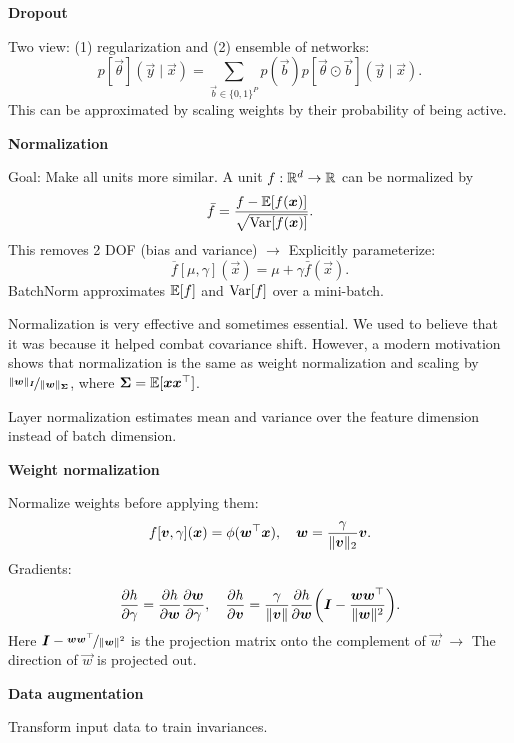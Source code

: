 \documentclass[10pt]{article}
\newenvironment{topic}[1]
{\textbf{\sffamily \colorbox{black}{\rlap{\textbf{\textcolor{white}{#1}}}\hspace{\linewidth}\hspace{-2\fboxsep}}}}
{}
\newenvironment{subtopic}[1]
{\begin{center}\textbf{\sffamily #1}\end{center}}
{}
\begin{document}
\begin{multicols*}{3}
\begin{topic}{Tricks of the trade}
\begin{subtopic}{Dropout}
            Two view: (1) regularization and (2) ensemble of networks: \[
                p[\vec{\theta}](\vec{y} \mid \vec{x}) = \sum_{\vec{b} \in \{ 0,1 \}^P} p(\vec{b}) p[\vec{\theta} \odot \vec{b}](\vec{y} \mid \vec{x}).
            \]
            This can be approximated by scaling weights by their probability of being active.
        \end{subtopic}

        \begin{subtopic}{Normalization}
            Goal: Make all units more similar. A unit $f: \mathbb{R}^d \to \mathbb{R}$ can be normalized by \[
                \bar{f} = \frac{f - \mathbb{E}[f(\bm{x})]}{\sqrt{\mathrm{Var}[f(\bm{x})]}}.
            \]
            This removes 2 DOF (bias and variance) $\to$ Explicitly parameterize: \[
                \overline{f}[\mu,\gamma](\vec{x}) = \mu + \gamma \bar{f}(\vec{x}).
            \]
            BatchNorm approximates $\mathbb{E}[f]$ and $\mathrm{Var}[f]$ over a mini-batch.

            Normalization is very effective and sometimes essential. We used to believe that it was because it
            helped combat covariance shift. However, a modern motivation shows that normalization is the same
            as weight normalization and scaling by $\nicefrac{\| \bm{w} \|_{\bm{I}}}{\| \bm{w}
                \|_{\bm{\Sigma}}}$, where $\bm{\Sigma} = \mathbb{E}[\bm{x}\bm{x}^\top]$.

            Layer normalization estimates mean and variance over the feature dimension instead of batch
            dimension.
        \end{subtopic}

        \begin{subtopic}{Weight normalization}
            Normalize weights before applying them: \[
                f[\bm{v},\gamma](\bm{x}) = \phi(\bm{w}^\top\bm{x}), \quad \bm{w} = \frac{\gamma}{\| \bm{v} \|_2} \bm{v}.
            \]
            Gradients: \[
                \pdv{h}{\gamma} = \pdv{h}{\vec{w}} \pdv{\vec{w}}{\gamma}, \quad \pdv{h}{\vec{v}} = \frac{\gamma}{\| \vec{v} \|} \pdv{h}{\vec{w}} \lft( \mat{I} - \frac{\vec{w}\transpose{\vec{w}}}{\| \vec{w} \|^2} \rgt).
            \]
            Here $\bm{I} - \nicefrac{\bm{w}\bm{w}^\top}{\| \bm{w} \|^2}$ is the projection matrix
            onto the complement of $\vec{w}$ $\to$ The direction of $\vec{w}$ is projected out.
        \end{subtopic}

        \begin{subtopic}{Data augmentation}
            Transform input data to train invariances.


\end{subtopic}
\end{topic}
\end{multicols*}
\end{document}
